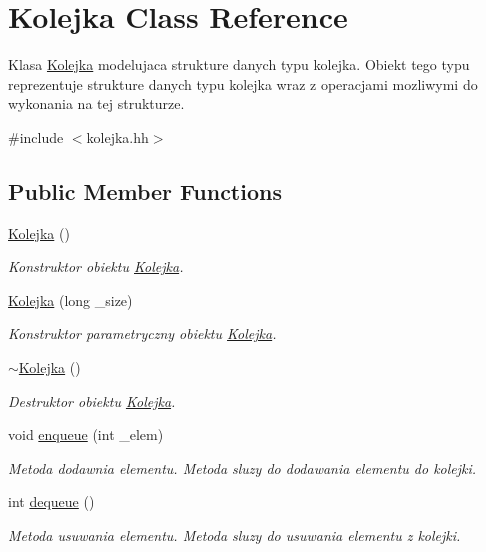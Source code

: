 \hypertarget{class_kolejka}{\section{Kolejka Class Reference}
\label{class_kolejka}
}


Klasa \hyperlink{class_kolejka}{Kolejka} modelujaca strukture danych typu kolejka. Obiekt tego typu reprezentuje strukture danych typu kolejka wraz z operacjami mozliwymi do wykonania na tej strukturze.  




{\ttfamily \#include $<$kolejka.\-hh$>$}

\subsection*{Public Member Functions}
\begin{DoxyCompactItemize}
\item 
\hyperlink{class_kolejka_a37c886fdc73dce62b04da0381dec5484}{Kolejka} ()
\begin{DoxyCompactList}\small\item\em Konstruktor obiektu \hyperlink{class_kolejka}{Kolejka}. \end{DoxyCompactList}\item 
\hyperlink{class_kolejka_ac942cc97bf0d2c30d11611c406acc5a8}{Kolejka} (long \-\_\-size)
\begin{DoxyCompactList}\small\item\em Konstruktor parametryczny obiektu \hyperlink{class_kolejka}{Kolejka}. \end{DoxyCompactList}\item 
\hyperlink{class_kolejka_a352f86ff08cd47be6c35c60bb0f873a6}{$\sim$\-Kolejka} ()
\begin{DoxyCompactList}\small\item\em Destruktor obiektu \hyperlink{class_kolejka}{Kolejka}. \end{DoxyCompactList}\item 
void \hyperlink{class_kolejka_a8f3b0111e85f517d9eadb8ce996d4471}{enqueue} (int \-\_\-elem)
\begin{DoxyCompactList}\small\item\em Metoda dodawnia elementu. Metoda sluzy do dodawania elementu do kolejki. \end{DoxyCompactList}\item 
int \hyperlink{class_kolejka_af23261614bcf242a1934a99688a2debc}{dequeue} ()
\begin{DoxyCompactList}\small\item\em Metoda usuwania elementu. Metoda sluzy do usuwania elementu z kolejki. \end{DoxyCompactList}\end{DoxyCompactItemize}
